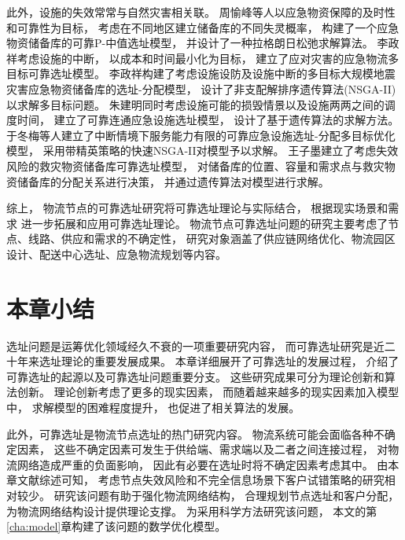 此外，设施的失效常常与自然灾害相关联。
周愉峰\cite{周愉峰应急}等人以应急物资保障的及时性和可靠性为目标，
考虑在不同地区建立储备库的不同失灵概率，
构建了一个应急物资储备库的可靠P-中值选址模型，
并设计了一种拉格朗日松弛求解算法。
李政祥\cite{李政祥1}考虑设施的中断，
以成本和时间最小化为目标，
建立了应对灾害的应急物流多目标可靠选址模型。
李政祥\cite{李政祥2}构建了考虑设施设防及设施中断的多目标大规模地震灾害应急物资储备库的选址-分配模型，
设计了非支配解排序遗传算法(NSGA-II)以求解多目标问题。
朱建明\cite{朱建明}同时考虑设施可能的损毁情景以及设施两两之间的调度时间，
建立了可靠连通应急设施选址模型，
设计了基于遗传算法的求解方法。
于冬梅等人\cite{于冬梅}建立了中断情境下服务能力有限的可靠应急设施选址-分配多目标优化模型，
采用带精英策略的快速NSGA-II对模型予以求解。
王子墨\cite{王子墨}建立了考虑失效风险的救灾物资储备库可靠选址模型，
对储备库的位置、容量和需求点与救灾物资储备库的分配关系进行决策，
并通过遗传算法对模型进行求解。

综上，
物流节点的可靠选址研究将可靠选址理论与实际结合，
根据现实场景和需求
进一步拓展和应用可靠选址理论。
物流节点可靠选址问题的研究主要考虑了节点、线路、供应和需求的不确定性，
研究对象涵盖了供应链网络优化、物流园区设计、配送中心选址、应急物流规划等内容。


\section{本章小结}

选址问题是运筹优化领域经久不衰的一项重要研究内容，
而可靠选址研究是近二十年来选址理论的重要发展成果。
本章详细展开了可靠选址的发展过程，
介绍了可靠选址的起源以及可靠选址问题重要分支。
这些研究成果可分为理论创新和算法创新。
理论创新考虑了更多的现实因素，
而随着越来越多的现实因素加入模型中，
求解模型的困难程度提升，
也促进了相关算法的发展。

此外，可靠选址是物流节点选址的热门研究内容。
物流系统可能会面临各种不确定因素，
这些不确定因素可发生于供给端、需求端以及二者之间连接过程，
对物流网络造成严重的负面影响，
因此有必要在选址时将不确定因素考虑其中。
由本章文献综述可知，
考虑节点失效风险和不完全信息场景下客户试错策略的研究相对较少。
研究该问题有助于强化物流网络结构，
合理规划节点选址和客户分配，
为物流网络结构设计提供理论支撑。
为采用科学方法研究该问题，
本文的第\ref{cha:model}章构建了该问题的数学优化模型。







